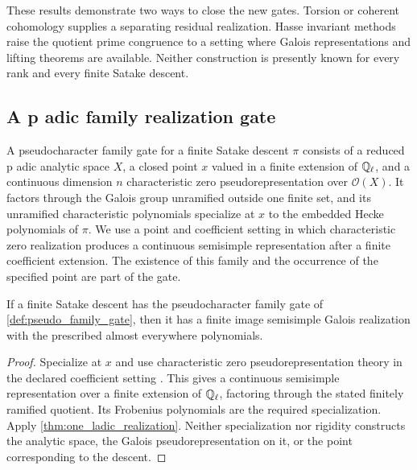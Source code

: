 \begin{remark}\label{rem:known_gate_examples}
These results demonstrate two ways to close the new gates. Torsion or coherent cohomology supplies a separating residual realization. Hasse invariant methods raise the quotient prime congruence to a setting where Galois representations and lifting theorems are available. Neither construction is presently known for every rank and every finite Satake descent.
\end{remark}

\subsection{A p adic family realization gate}

\begin{definition}\label{def:pseudo_family_gate}
A pseudocharacter family gate for a finite Satake descent \(\pi\) consists of a reduced p adic analytic space \(X\), a closed point \(x\) valued in a finite extension of \(\mathbb Q_\ell\), and a continuous dimension \(n\) characteristic zero pseudorepresentation over \(\mathcal O(X)\). It factors through the Galois group unramified outside one finite set, and its unramified characteristic polynomials specialize at \(x\) to the embedded Hecke polynomials of \(\pi\). We use a point and coefficient setting in which characteristic zero realization produces a continuous semisimple representation after a finite coefficient extension. The existence of this family and the occurrence of the specified point are part of the gate.
\end{definition}

\begin{theorem}\label{thm:pseudo_family_closes}
If a finite Satake descent has the pseudocharacter family gate of \cref{def:pseudo_family_gate}, then it has a finite image semisimple Galois realization with the prescribed almost everywhere polynomials.
\end{theorem}

\begin{proof}
Specialize at \(x\) and use characteristic zero pseudorepresentation theory in the declared coefficient setting \cite{Chenevier2014}. This gives a continuous semisimple representation over a finite extension of \(\mathbb Q_\ell\), factoring through the stated finitely ramified quotient. Its Frobenius polynomials are the required specialization. Apply \cref{thm:one_ladic_realization}. Neither specialization nor rigidity constructs the analytic space, the Galois pseudorepresentation on it, or the point corresponding to the descent.
\end{proof}

